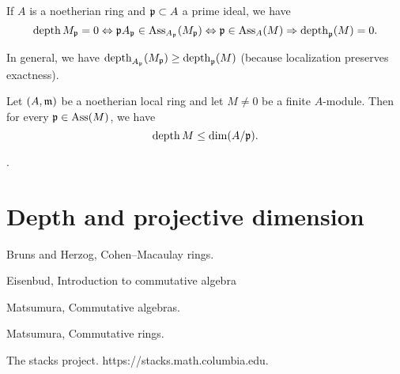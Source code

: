 	\begin{lemma}
		If $A$ is a noetherian ring and $\mathfrak{p}\subset A$ a prime ideal, we have
		$$
		\operatorname{depth} M_{\mathfrak{p}} = 0 \Leftrightarrow \mathfrak{p} A_{\mathfrak{p}} \in \operatorname{Ass}_{A_{\mathfrak{p}}}(M_{\mathfrak{p}}) \Leftrightarrow \mathfrak{p} \in \operatorname{Ass}_A(M) \Rightarrow \operatorname{depth}_{\mathfrak{p}}(M) =0.
		$$
		
		In general, we have $\operatorname{depth}_{A_{\mathfrak{p}}}(M_{\mathfrak{p}}) \geq \operatorname{depth}_{\mathfrak{p}}(M)$ (because localization preserves exactness).
	\end{lemma}
	
	
	\begin{theorem}
		Let $(A, \mathfrak{m})$ be a noetherian local ring and let $M \neq 0$ be a finite $A$-module. Then for every $\mathfrak{p} \in \operatorname{Ass}(M)$, we have
		$$
		\operatorname{depth} M \leq \dim(A/\mathfrak{p})
		.$$
		
		\cite[Thoerem 29, page 104]{matsumura-alg}.
	\end{theorem}
	
	\section{Depth and projective dimension}
	
	
	
	\begin{thebibliography}{99}
		
		Bruns and Herzog, Cohen--Macaulay rings.
		
		Eisenbud, Introduction to commutative algebra
		
		Matsumura, Commutative algebras.
		
		Matsumura, Commutative rings.
		
		The stacks project. https://stacks.math.columbia.edu.
		
	\end{thebibliography}
	

